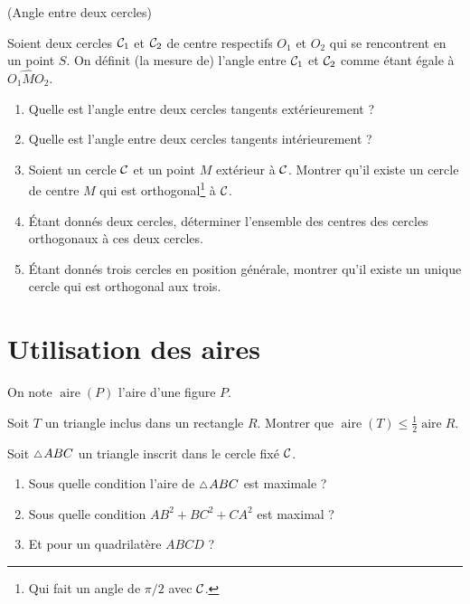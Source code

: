 \documentclass[a4paper,11pt,reqno]{amsart}
\DeclareMathOperator{\aire}{aire}
\begin{document}
\begin{exo} (Angle entre deux cercles)

  Soient deux cercles $\mathcal{C}_{1}$ et $\mathcal{C}_{2}$ de centre respectifs $O_{1}$ et $O_{2}$ qui se rencontrent en un point $S$. On définit (la mesure de) l'angle entre $\mathcal{C}_{1}$ et $\mathcal{C}_{2}$ comme étant égale à $\widehat{O_{1}MO_{2}}$.
  \begin{enumerate}
    \item Quelle est l'angle entre deux cercles tangents extérieurement ?
    \item Quelle est l'angle entre deux cercles tangents intérieurement ?
    \item Soient un cercle $\mathcal{C}$ et un point $M$ extérieur à $\mathcal{C}$. Montrer qu'il existe un cercle de centre $M$ qui est orthogonal\footnote{Qui fait un angle de $\pi/2$ avec $\mathcal{C}$.} à $\mathcal{C}$.
    \item Étant donnés deux cercles, déterminer l'ensemble des centres des cercles orthogonaux à ces deux cercles.
    \item Étant donnés trois cercles en position générale, montrer qu'il existe un unique cercle qui est orthogonal aux trois.
  \end{enumerate}
\end{exo}


\section{Utilisation des aires}

\begin{convention}
  On note $\aire (P)$ l'aire d'une figure $P$.
\end{convention}

\begin{exo}[.35]

  Soit $T$ un triangle inclus dans un rectangle $R$. Montrer que $\aire(T) \leqslant \frac{1}{2}\aire{R}$.
\end{exo}

\begin{exo}
  Soit $\tri ABC$ un triangle inscrit dans le cercle fixé $\mathcal{C}$.
  \begin{enumerate}
    \item Sous quelle condition l'aire de $\tri ABC$ est maximale ?
    \item Sous quelle condition $AB^{2}+BC^{2}+CA^{2}$ est maximal ?
    \item Et pour un quadrilatère $ABCD$ ?
  \end{enumerate}

\end{exo}
\end{document}
